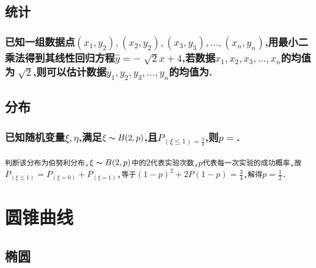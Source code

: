 \documentclass[oneside]{book}
\newcommand{\1}{\underline{\makebox[1cm]{}}}
\newcommand{\2}{\underline{\makebox[2cm]{}}}
\newcommand{\3}{\underline{\makebox[3cm]{}}}
\newcommand{\4}{\underline{\makebox[4cm]{}}}
\newcommand{\blkc}{\vspace*{6\baselineskip} }
\newcommand{\lge}{\large \texttt}
\newlength{\la}
\begin{document}
    \chapter{统计}
        \section{已知一组数据点$(x_1,y_2), (x_2,y_2), (x_3,y_3),\dots, (x_n,y_n)$,用最小二乘法得到其线性回归方程$\hat{y}=-\sqrt[]{2}x+4$,若数据$x_1, x_2, x_3,\dots, x_n$的均值为$\sqrt[]{2}$,则可以估计数据$y_1, y_2, y_3,\dots, y_n$的均值为\2.}
        \blkc

    \chapter{分布}
        \section{已知随机变量$\xi, \eta $,满足$\xi \thicksim B(2, p)$,且$P_{(\xi \leq 1) = \frac{3}{4}}$,则$p = $\2.}
        \lge{判断该分布为伯努利分布,$\xi \thicksim B(2, p)$中的$2$代表实验次数,$p$代表每一次实验的成功概率,故$P_{(\xi \leq 1)} = P_{(\xi = 0)} + P_{(\xi = 1)}$,等于$(1 - p)^2 + 2P(1 - p) = \frac{3}{4}$,解得$p = \frac{1}{2}$.}



\part{圆锥曲线}

    \chapter{椭圆}
\end{document}
